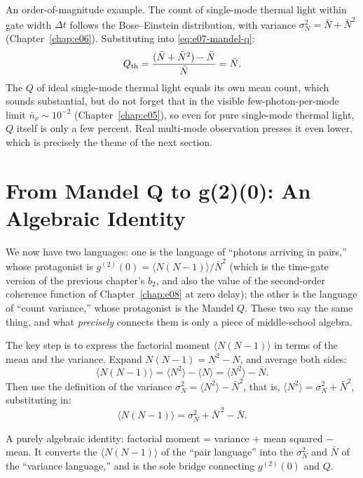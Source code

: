 An order-of-magnitude example. The count of single-mode thermal light within gate width \(\Delta t\) follows the Bose--Einstein distribution, with variance \(\sigma_N^2=\bar N+\bar N^2\) (Chapter~\ref{chap:e06}). Substituting into \eqref{eq:e07-mandel-q}:
\[
  Q_{\rm th}=\frac{(\bar N+\bar N^2)-\bar N}{\bar N}=\bar N .
\]
The \(Q\) of ideal single-mode thermal light equals its own mean count, which sounds substantial, but do not forget that in the visible few-photon-per-mode limit \(\bar n_\nu\sim10^{-2}\) (Chapter~\ref{chap:e05}), so even for pure single-mode thermal light, \(Q\) itself is only a few percent. Real multi-mode observation presses it even lower, which is precisely the theme of the next section.

\section{From Mandel Q to g(2)(0): An Algebraic Identity}
\label{sec:e07-q-to-g2}

We now have two languages: one is the language of ``photons arriving in pairs,'' whose protagonist is \(g^{(2)}(0)=\langle N(N-1)\rangle/\bar N^2\) (which is the time-gate version of the previous chapter's \(b_2\), and also the value of the second-order coherence function of Chapter~\ref{chap:e08} at zero delay); the other is the language of ``count variance,'' whose protagonist is the Mandel \(Q\). These two say the same thing, and what \emph{precisely} connects them is only a piece of middle-school algebra.

The key step is to express the factorial moment \(\langle N(N-1)\rangle\) in terms of the mean and the variance. Expand \(N(N-1)=N^2-N\), and average both sides:
\[
  \big\langle N(N-1)\big\rangle=\big\langle N^2\big\rangle-\langle N\rangle
  =\big\langle N^2\big\rangle-\bar N .
\]
Then use the definition of the variance \(\sigma_N^2=\langle N^2\rangle-\bar N^2\), that is, \(\langle N^2\rangle=\sigma_N^2+\bar N^2\), substituting in:
\begin{equation}
  \big\langle N(N-1)\big\rangle=\sigma_N^2+\bar N^{\,2}-\bar N .
  \label{eq:e07-identity}
\end{equation}
\begin{formulaexplain}
A purely algebraic identity: factorial moment = variance + mean squared \(-\) mean. It converts the \(\langle N(N-1)\rangle\) of the ``pair language'' into the \(\sigma_N^2\) and \(\bar N\) of the ``variance language,'' and is the sole bridge connecting \(g^{(2)}(0)\) and \(Q\).
\end{formulaexplain}

